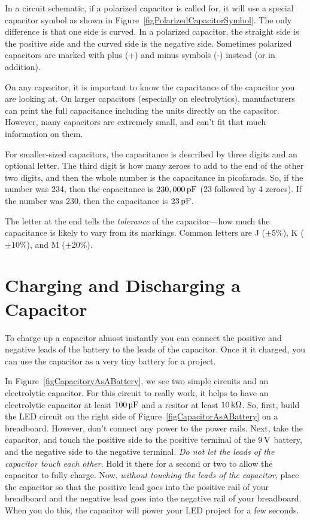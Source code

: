 In a circuit schematic, if a polarized capacitor is called for, it will use a special capacitor symbol as shown in Figure~\ref{figPolarizedCapacitorSymbol}. 
The only difference is that one side is curved.
In a polarized capacitor, the straight side is the positive side and the curved side is the negative side.
Sometimes polarized capacitors are marked with plus (+) and minus symbols (-) instead (or in addition).


On any capacitor, it is important to know the capacitance of the capacitor you are looking at.
On larger capacitors (especially on electrolytics), manufacturers can print the full capacitance including the units directly on the capacitor.
However, many capacitors are extremely small, and can't fit that much information on them.

For smaller-sized capacitors, the capacitance is described by three digits and an optional letter.
The third digit is how many zeroes to add to the end of the other two digits, and then the whole number is the capacitance in picofarads.
So, if the number was 234, then the capacitance is $230,000\mypf$ (23 followed by 4 zeroes).  
If the number was 230, then the capacitance is $23\mypf$.

The letter at the end tells the \emph{tolerance} of the capacitor---how much the capacitance is likely to vary from its markings.
Common letters are J ($\pm5\%$), K ($\pm10\%$), and M ($\pm20\%$).

\section{Charging and Discharging a Capacitor}

To charge up a capacitor almost instantly you can connect the positive and negative leads of the battery to the leads of the capacitor.
Once it it charged, you can use the capacitor as a very tiny battery for a project.


In Figure~\ref{figCapacitoryAsABattery}, we see two simple circuits and an electrolytic capacitor.
For this circuit to really work, it helps to have an electrolytic capacitor at least $100\,\si{\micro\farad}$ and a resitor at least $10\,\si{\kilo\ohm}$.
So, first, build the LED circuit on the right side of Figure~\ref{figCapacitorAsABattery} on a breadboard.
However, don't connect any power to the power rails.
Next, take the capacitor, and touch the positive side to the positive terminal of the $9\,\si{\volt}$ battery, and the negative side to the negative terminal.
\emph{Do not let the leads of the capacitor touch each other}.
Hold it there for a second or two to allow the capacitor to fully charge.
Now, \emph{without touching the leads of the capacitor}, place the capacitor so that the positive lead goes into the positive rail of your breadboard and the negative lead goes into the negative rail of your breadboard.
When you do this, the capacitor will power your LED project for a few seconds.

